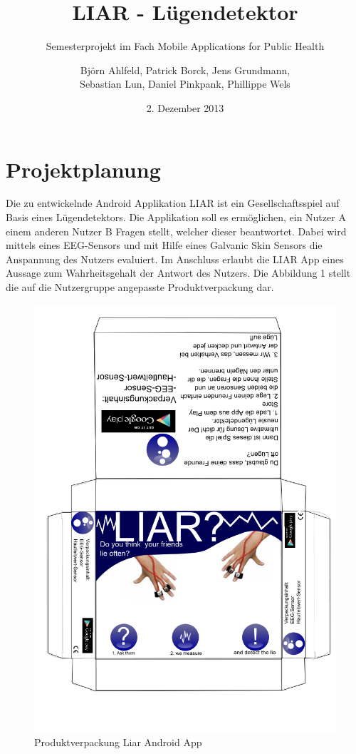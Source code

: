 \documentclass[10pt, a4paper, oneside, titlepage]{scrartcl} %
\date{2. Dezember 2013}
\author{Björn Ahlfeld, Patrick Borck, Jens Grundmann,\\ Sebastian Lun, Daniel Pinkpank, Phillippe Wels}
\title{LIAR - Lügendetektor}
\subtitle{Semesterprojekt im Fach Mobile Applications for Public Health}
\begin{document}
   	\maketitle
   	\thispagestyle{empty}
	\tableofcontents
	\listoffigures
	\listoftables
	
   	\newpage   	
   	\section{Projektplanung}
   	Die zu entwickelnde Android Applikation LIAR ist ein Gesellschaftsspiel auf Basis eines Lügendetektors. Die Applikation soll es ermöglichen, ein Nutzer A einem anderen Nutzer B Fragen stellt, welcher dieser beantwortet. Dabei wird mittels eines EEG-Sensors und mit Hilfe eines Galvanic Skin Sensors die Anspannung des Nutzers evaluiert. Im Anschluss erlaubt die LIAR App eines Aussage zum Wahrheitsgehalt der Antwort des Nutzers. Die Abbildung 1 stellt die auf die Nutzergruppe angepasste Produktverpackung dar.
   \begin{figure}[ht!]
	\begin{center}
		\includegraphics[scale=0.5]{verpackung_bjoern.png}
	\end{center}
	\caption[Produktverpackung]{Produktverpackung Liar Android App}
	\label{fig:verpackung}
	\end{figure}
\end{document}
